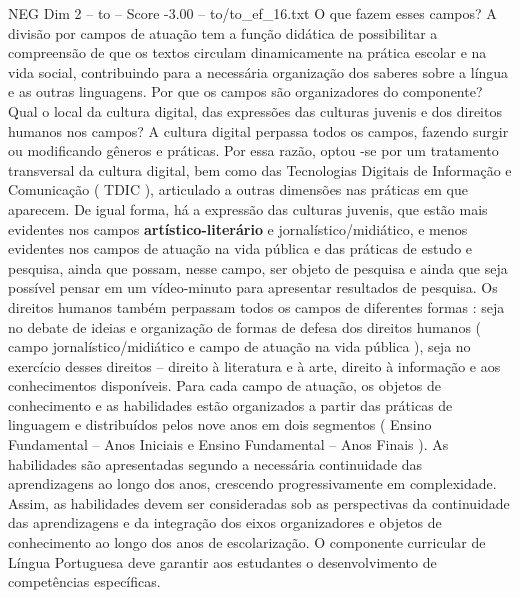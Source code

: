 \begin{textsample}{NEG Dim 2 – to – Score -3.00 – to/to\_ef\_16.txt}
O que fazem esses campos?
A divisão por campos de atuação tem a função didática de possibilitar a compreensão de que os textos circulam dinamicamente na prática escolar e na vida social, contribuindo para a necessária organização dos saberes sobre a língua e as outras linguagens.
Por que os campos são organizadores do componente?
Qual o local da cultura digital, das expressões das culturas juvenis e dos direitos humanos nos campos?
A cultura digital perpassa todos os campos, fazendo surgir ou modificando gêneros e práticas.
Por essa razão, optou -se por um tratamento transversal da cultura digital, bem como das Tecnologias Digitais de Informação e Comunicação ( TDIC ), articulado a outras dimensões nas práticas em que aparecem.
De igual forma, há a expressão das culturas juvenis, que estão mais evidentes nos campos \textbf{artístico-literário} e jornalístico/midiático, e menos evidentes nos campos de atuação na vida pública e das práticas de estudo e pesquisa, ainda que possam, nesse campo, ser objeto de pesquisa e ainda que seja possível pensar em um vídeo-minuto para apresentar resultados de pesquisa.
Os direitos humanos também perpassam todos os campos de diferentes formas : seja no debate de ideias e organização de formas de defesa dos direitos humanos ( campo jornalístico/midiático e campo de atuação na vida pública ), seja no exercício desses direitos – direito à literatura e à arte, direito à informação e aos conhecimentos disponíveis.
Para cada campo de atuação, os objetos de conhecimento e as habilidades estão organizados a partir das práticas de linguagem e distribuídos pelos nove anos em dois segmentos ( Ensino Fundamental – Anos Iniciais e Ensino Fundamental – Anos Finais ).
As habilidades são apresentadas segundo a necessária continuidade das aprendizagens ao longo dos anos, crescendo progressivamente em complexidade.
Assim, as habilidades devem ser consideradas sob as perspectivas da continuidade das aprendizagens e da integração dos eixos organizadores e objetos de conhecimento ao longo dos anos de escolarização.
O componente curricular de Língua Portuguesa deve garantir aos estudantes o desenvolvimento de competências específicas.

\end{textsample}
